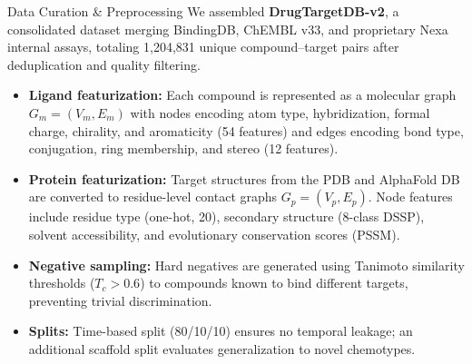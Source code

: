 \documentclass[20pt,landscape]{extarticle}
\begin{document}
\begin{minipage}[t]{0.325\textwidth}
\begin{posterblock}{Data Curation \& Preprocessing}
We assembled \textbf{DrugTargetDB-v2}, a consolidated dataset merging BindingDB, ChEMBL v33, and
proprietary Nexa internal assays, totaling 1,204,831 unique compound--target pairs after deduplication
and quality filtering.

\begin{itemize}
  \item \textbf{Ligand featurization:} Each compound is represented as a molecular graph $G_m = (V_m, E_m)$
        with nodes encoding atom type, hybridization, formal charge, chirality, and aromaticity (54 features)
        and edges encoding bond type, conjugation, ring membership, and stereo (12 features).
  \item \textbf{Protein featurization:} Target structures from the PDB and AlphaFold DB are converted to
        residue-level contact graphs $G_p = (V_p, E_p)$. Node features include residue type (one-hot, 20),
        secondary structure (8-class DSSP), solvent accessibility, and evolutionary conservation scores (PSSM).
  \item \textbf{Negative sampling:} Hard negatives are generated using Tanimoto similarity thresholds
        ($T_c > 0.6$) to compounds known to bind different targets, preventing trivial discrimination.
  \item \textbf{Splits:} Time-based split (80/10/10) ensures no temporal leakage; an additional
        scaffold split evaluates generalization to novel chemotypes.
\end{itemize}
\end{posterblock}

\end{minipage}%
\hfill
\end{document}

